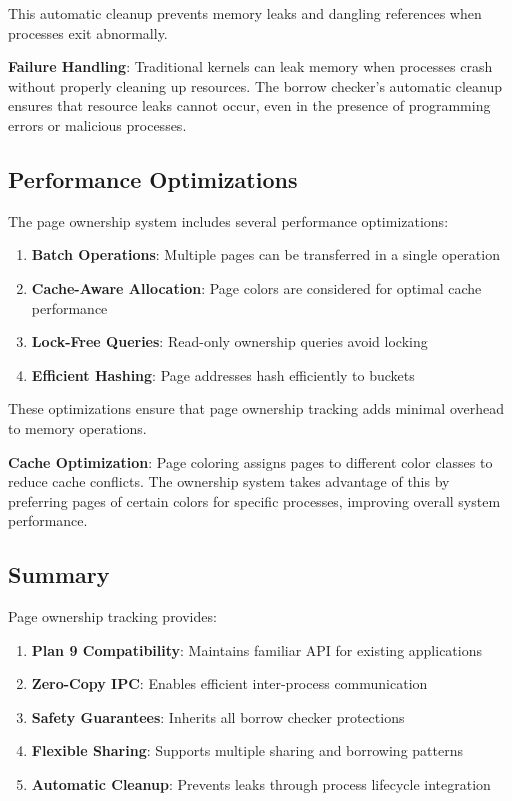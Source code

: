 \documentclass[11pt,letterpaper]{article}
\begin{document}
This automatic cleanup prevents memory leaks and dangling references when processes exit abnormally.

\textbf{Failure Handling}: Traditional kernels can leak memory when processes crash without properly cleaning up resources. The borrow checker's automatic cleanup ensures that resource leaks cannot occur, even in the presence of programming errors or malicious processes.

\subsection{Performance Optimizations}

The page ownership system includes several performance optimizations:

\begin{enumerate}
\item \textbf{Batch Operations}: Multiple pages can be transferred in a single operation
\item \textbf{Cache-Aware Allocation}: Page colors are considered for optimal cache performance
\item \textbf{Lock-Free Queries}: Read-only ownership queries avoid locking
\item \textbf{Efficient Hashing}: Page addresses hash efficiently to buckets
\end{enumerate}

These optimizations ensure that page ownership tracking adds minimal overhead to memory operations.

\textbf{Cache Optimization}: Page coloring assigns pages to different color classes to reduce cache conflicts. The ownership system takes advantage of this by preferring pages of certain colors for specific processes, improving overall system performance.

\subsection{Summary}

Page ownership tracking provides:

\begin{enumerate}
\item \textbf{Plan 9 Compatibility}: Maintains familiar API for existing applications
\item \textbf{Zero-Copy IPC}: Enables efficient inter-process communication
\item \textbf{Safety Guarantees}: Inherits all borrow checker protections
\item \textbf{Flexible Sharing}: Supports multiple sharing and borrowing patterns
\item \textbf{Automatic Cleanup}: Prevents leaks through process lifecycle integration
\end{enumerate}
\end{document}
